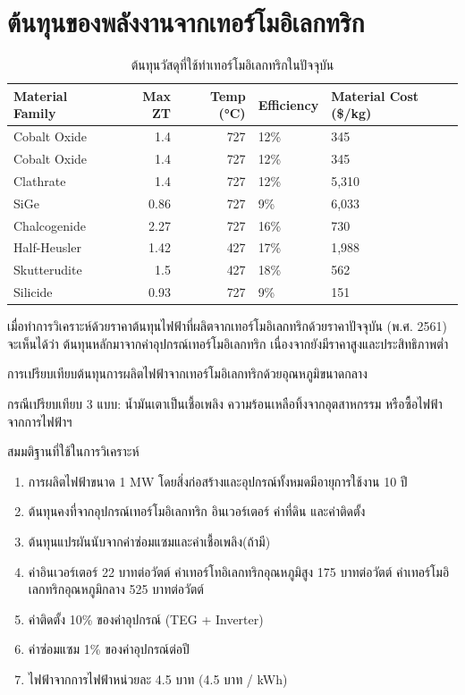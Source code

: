 \documentclass[a4paper,nobib,openany]{tufte-book}
\begin{document}
\section{ต้นทุนของพลังงานจากเทอร์โมอิเลกทริก}
\label{sec:org4fee4e9}

\begin{table}[htbp]
\caption{ต้นทุนวัสดุที่ใช้ทำเทอร์โมอิเลกทริกในปัจจุบัน}
\centering
\begin{tabular}{lrrlp{1cm}}
\toprule
Material Family & Max ZT & Temp (°C) & Efficiency & Material Cost (\$/kg)\\
\midrule
Cobalt Oxide & 1.4 & 727 & 12\% & 345\\
Cobalt Oxide & 1.4 & 727 & 12\% & 345\\
Clathrate & 1.4 & 727 & 12\% & 5,310\\
SiGe & 0.86 & 727 & 9\% & 6,033\\
Chalcogenide & 2.27 & 727 & 16\% & 730\\
Half-Heusler & 1.42 & 427 & 17\% & 1,988\\
Skutterudite & 1.5 & 427 & 18\% & 562\\
Silicide & 0.93 & 727 & 9\% & 151\\
\bottomrule
\end{tabular}
\end{table}

เมื่อทำการวิเคราะห์ด้วยราคาต้นทุนไฟฟ้าที่ผลิตจากเทอร์โมอิเลกทริกด้วยราคาปัจจุบัน
(พ.ศ. 2561) จะเห็นได้ว่า ต้นทุนหลักมาจากค่าอุปกรณ์เทอร์โมอิเลกทริก
เนื่องจากยังมีราคาสูงและประสิทธิภาพต่ำ

การเปรียบเทียบต้นทุนการผลิตไฟฟ้าจากเทอร์โมอิเลกทริกด้วยอุณหภูมิขนาดกลาง

กรณีเปรียบเทียบ 3 แบบ: น้ำมันเตาเป็นเชื้อเพลิง
ความร้อนเหลือทิ้งจากอุตสาหกรรม หรือซื้อไฟฟ้าจากการไฟฟ้าฯ

สมมติฐานที่ใช้ในการวิเคราะห์

\begin{enumerate}
\item การผลิตไฟฟ้าขนาด 1 MW โดยสิ่งก่อสร้างและอุปกรณ์ทั้งหมดมีอายุการใช้งาน
10 ปี

\item ต้นทุนคงที่จากอุปกรณ์เทอร์โมอิเลกทริก อินเวอร์เตอร์ ค่าที่ดิน
และค่าติดตั้ง

\item ต้นทุนแปรผันนับจากค่าซ่อมแซมและค่าเชื้อเพลิง(ถ้ามี)

\item ค่าอินเวอร์เตอร์ 22 บาทต่อวัตต์ ค่าเทอร์โทอิเลกทริกอุณหภูมิสูง 175
บาทต่อวัตต์ ค่าเทอร์โมอิเลกทริกอุณหภูมิกลาง 525 บาทต่อวัตต์

\item ค่าติดตั้ง 10\% ของค่าอุปกรณ์ (TEG + Inverter)

\item ค่าซ่อมแซม 1\% ของค่าอุปกรณ์ต่อปี

\item ไฟฟ้าจากการไฟฟ้าหน่วยละ 4.5 บาท (4.5 บาท / kWh)
\end{enumerate}
\end{document}
